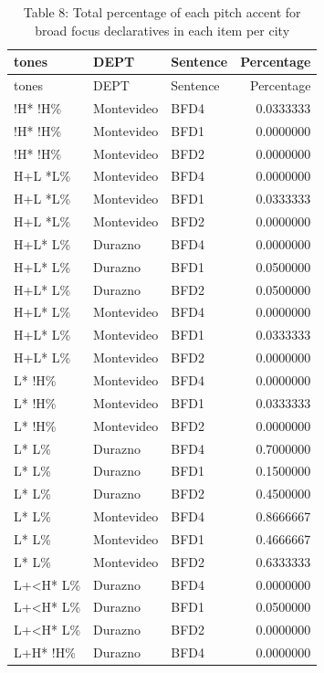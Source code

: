 \documentclass[
  man]{apa6}
\begin{document}
\begin{longtable}[]{@{}lllr@{}}
\caption{\label{tab:unnamed-chunk-17}Table 8: Total percentage of each pitch accent for broad focus declaratives in each item per city}\tabularnewline
\toprule\noalign{}
tones & DEPT & Sentence & Percentage \\
\midrule\noalign{}
\endfirsthead
\toprule\noalign{}
tones & DEPT & Sentence & Percentage \\
\midrule\noalign{}
\endhead
\bottomrule\noalign{}
\endlastfoot
!H* !H\% & Montevideo & BFD4 & 0.0333333 \\
!H* !H\% & Montevideo & BFD1 & 0.0000000 \\
!H* !H\% & Montevideo & BFD2 & 0.0000000 \\
H+L *L\% & Montevideo & BFD4 & 0.0000000 \\
H+L *L\% & Montevideo & BFD1 & 0.0333333 \\
H+L *L\% & Montevideo & BFD2 & 0.0000000 \\
H+L* L\% & Durazno & BFD4 & 0.0000000 \\
H+L* L\% & Durazno & BFD1 & 0.0500000 \\
H+L* L\% & Durazno & BFD2 & 0.0500000 \\
H+L* L\% & Montevideo & BFD4 & 0.0000000 \\
H+L* L\% & Montevideo & BFD1 & 0.0333333 \\
H+L* L\% & Montevideo & BFD2 & 0.0000000 \\
L* !H\% & Montevideo & BFD4 & 0.0000000 \\
L* !H\% & Montevideo & BFD1 & 0.0333333 \\
L* !H\% & Montevideo & BFD2 & 0.0000000 \\
L* L\% & Durazno & BFD4 & 0.7000000 \\
L* L\% & Durazno & BFD1 & 0.1500000 \\
L* L\% & Durazno & BFD2 & 0.4500000 \\
L* L\% & Montevideo & BFD4 & 0.8666667 \\
L* L\% & Montevideo & BFD1 & 0.4666667 \\
L* L\% & Montevideo & BFD2 & 0.6333333 \\
L+\textless H* L\% & Durazno & BFD4 & 0.0000000 \\
L+\textless H* L\% & Durazno & BFD1 & 0.0500000 \\
L+\textless H* L\% & Durazno & BFD2 & 0.0000000 \\
L+H* !H\% & Durazno & BFD4 & 0.0000000 \\

\end{longtable}
\end{document}
